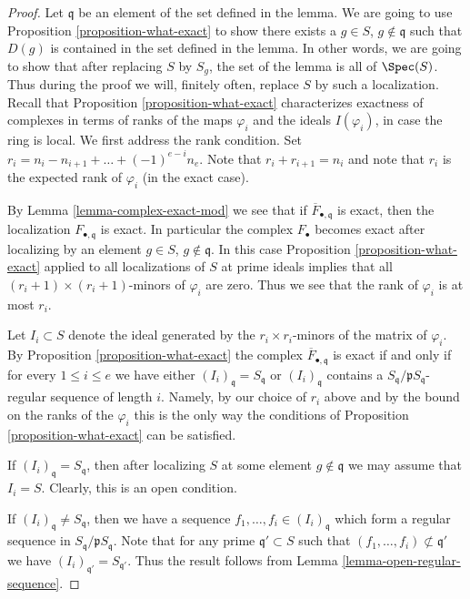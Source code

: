 \begin{proof}
Let $\mathfrak q$ be an element of the set defined in the lemma.
We are going to use Proposition \ref{proposition-what-exact}
to show there exists a $g \in S$, $g \not \in \mathfrak q$
such that $D(g)$ is contained in the set defined in the lemma.
In other words, we are going to show that after replacing $S$
by $S_g$, the set of the lemma is all of $\Spec(S)$.
Thus during the proof we will, finitely often, replace
$S$ by such a localization.
Recall that Proposition \ref{proposition-what-exact}
characterizes exactness of complexes
in terms of ranks of the maps $\varphi_i$ and the ideals
$I(\varphi_i)$, in case the ring is local. We first address
the rank condition. Set
$r_i = n_i - n_{i + 1} + \ldots + (-1)^{e - i} n_e$.
Note that $r_i + r_{i + 1} = n_i$ and note that
$r_i$ is the expected rank of $\varphi_i$ (in the
exact case).

\medskip\noindent
By Lemma \ref{lemma-complex-exact-mod} we see that if
$\overline{F}_{\bullet, \mathfrak q}$ is exact, then
the localization $F_{\bullet, \mathfrak q}$ is exact.
In particular the complex $F_\bullet$ becomes
exact after localizing by an element
$g \in S$, $g \not \in \mathfrak q$. In this case
Proposition \ref{proposition-what-exact} applied
to all localizations of $S$ at prime ideals
implies that all $(r_i + 1) \times (r_i + 1)$-minors
of $\varphi_i$ are zero. Thus we see that the rank
of $\varphi_i$ is at most $r_i$.

\medskip\noindent
Let $I_i \subset S$ denote the ideal generated
by the $r_i \times r_i$-minors of the matrix
of $\varphi_i$. By Proposition \ref{proposition-what-exact}
the complex $\overline{F}_{\bullet, \mathfrak q}$ is exact
if and only if for every $1 \leq i \leq e$ we have
either $(I_i)_{\mathfrak q} = S_{\mathfrak q}$ or
$(I_i)_{\mathfrak q}$ contains a $S_{\mathfrak q}/\mathfrak p
S_{\mathfrak q}$-regular sequence of length $i$.
Namely, by our choice of $r_i$ above and by the
bound on the ranks of the $\varphi_i$ this is the
only way the conditions of Proposition \ref{proposition-what-exact}
can be satisfied.

\medskip\noindent
If $(I_i)_{\mathfrak q} = S_{\mathfrak q}$, then after localizing $S$ at
some element $g \not\in \mathfrak q$ we may assume that
$I_i = S$. Clearly, this is an open condition.

\medskip\noindent
If $(I_i)_{\mathfrak q} \not = S_{\mathfrak q}$, then we have
a sequence $f_1, \ldots, f_i \in (I_i)_{\mathfrak q}$ which
form a regular sequence in $S_{\mathfrak q}/\mathfrak pS_{\mathfrak q}$.
Note that for any prime $\mathfrak q' \subset S$ such that
$(f_1, \ldots, f_i) \not \subset \mathfrak q'$ we have
$(I_i)_{\mathfrak q'} = S_{\mathfrak q'}$.
Thus the result follows from Lemma \ref{lemma-open-regular-sequence}.
\end{proof}